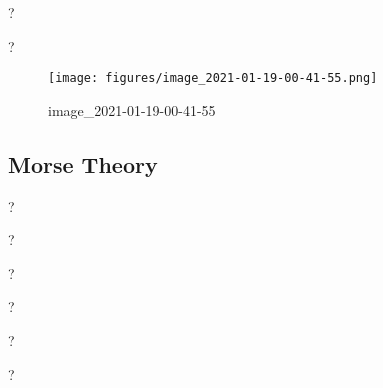 \begin{definition}

?

\end{definition}

\begin{definition}[$p/q$ Surgery]

?

\end{definition}

\begin{figure}
\centering
\texttt{[image: figures/image\_2021-01-19-00-41-55.png]}
\caption{image\_2021-01-19-00-41-55}
\end{figure}

\hypertarget{morse-theory}{%
\subsection{Morse Theory}\label{morse-theory}}

\begin{definition}

?

\end{definition}

\begin{definition}

?

\end{definition}

\begin{definition}

?

\end{definition}

\begin{definition}

?

\end{definition}

\begin{definition}

?

\end{definition}

\begin{theorem}

?

\end{theorem}

